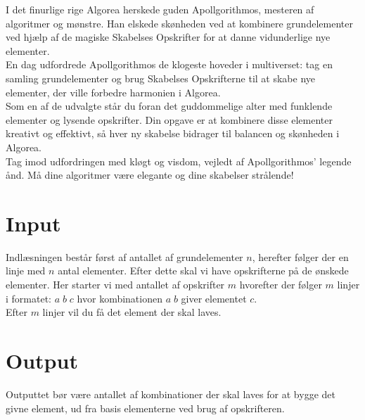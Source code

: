 I det finurlige rige Algorea herskede guden Apollgorithmos, mesteren af algoritmer og mønstre. Han elskede skønheden ved at kombinere grundelementer ved hjælp af de magiske Skabelses Opskrifter for at danne vidunderlige nye elementer.\\
En dag udfordrede Apollgorithmos de klogeste hoveder i multiverset: tag en samling grundelementer og brug Skabelses Opskrifterne til at skabe nye elementer, der ville forbedre harmonien i Algorea.\\
Som en af de udvalgte står du foran det guddommelige alter med funklende elementer og lysende opskrifter. Din opgave er at kombinere disse elementer kreativt og effektivt, så hver ny skabelse bidrager til balancen og skønheden i Algorea.\\
Tag imod udfordringen med kløgt og visdom, vejledt af Apollgorithmos' legende ånd. Må dine algoritmer være elegante og dine skabelser strålende!
\section*{Input}
Indlæsningen består først af antallet af grundelementer \(n\), herefter følger der en linje med \(n\) antal elementer.
Efter dette skal vi have opskrifterne på de ønskede elementer. Her starter vi med antallet af opskrifter \(m\) hvorefter der følger \(m\) linjer i formatet: \(a\;b\;c\) hvor kombinationen \(a\;b\) giver elementet \(c\).\\
Efter \(m\) linjer vil du få det element der skal laves.
\section*{Output}
Outputtet bør være antallet af kombinationer der skal laves for at bygge det givne element, ud fra basis elementerne ved brug af opskrifteren.
